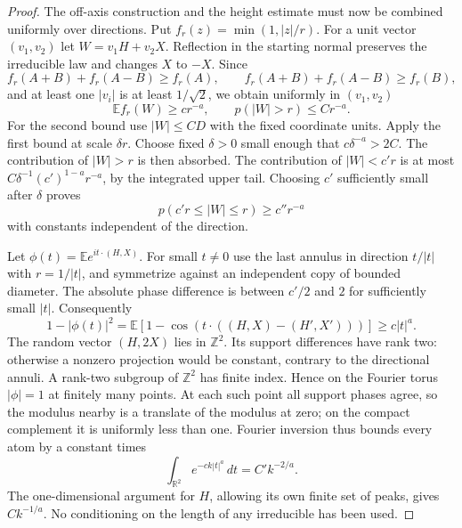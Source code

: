 \begin{proof}
The off-axis construction and the height estimate must now be combined
uniformly over directions. Put $f_r(z)=\min(1,|z|/r)$. For a unit vector
$(v_1,v_2)$ let $W=v_1H+v_2X$. Reflection in the starting normal preserves
the irreducible law and changes $X$ to $-X$. Since
\[
 f_r(A+B)+f_r(A-B)\ge f_r(A),\qquad
 f_r(A+B)+f_r(A-B)\ge f_r(B),
\]
and at least one $|v_i|$ is at least $1/\sqrt2$, we obtain uniformly in
$(v_1,v_2)$
\[
 \mathbb E f_r(W)\ge c r^{-a},\qquad p(|W|>r)\le C r^{-a}.
\]
For the second bound use $|W|\le C D$ with the fixed coordinate units.
Apply the first bound at scale $\delta r$. Choose fixed $\delta>0$ small
enough that $c\delta^{-a}>2C$. The contribution of $|W|>r$ is then absorbed.
The contribution of $|W|<c'r$ is at most
$C\delta^{-1}(c')^{1-a}r^{-a}$, by the integrated upper tail. Choosing $c'$
sufficiently small after $\delta$ proves
\[
 p(c'r\le |W|\le r)\ge c''r^{-a}
\]
with constants independent of the direction.

Let $\phi(t)=\mathbb E e^{it\cdot(H,X)}$. For small $t\ne0$ use the last
annulus in direction $t/|t|$ with $r=1/|t|$, and symmetrize against an
independent copy of bounded diameter. The absolute phase difference is
between $c'/2$ and $2$ for sufficiently small $|t|$. Consequently
\[
 1-|\phi(t)|^2=\mathbb E[1-\cos(t\cdot((H,X)-(H',X')))]
       \ge c|t|^a.
\]
The random vector $(H,2X)$ lies in $\mathbb Z^2$. Its support differences
have rank two: otherwise a nonzero projection would be constant, contrary
to the directional annuli. A rank-two subgroup of $\mathbb Z^2$ has finite
index. Hence on the Fourier torus $|\phi|=1$ at finitely many points.
At each such point all support phases agree, so the modulus nearby is a
translate of the modulus at zero; on the compact complement it is uniformly
less than one. Fourier inversion thus bounds every atom by a constant times
\[
 \int_{\mathbb R^2}e^{-ck|t|^a}\,dt=C'k^{-2/a}.
\]
The one-dimensional argument for $H$, allowing its own finite set of peaks,
gives $Ck^{-1/a}$. No conditioning on the length of any irreducible has
been used.

\end{proof}

